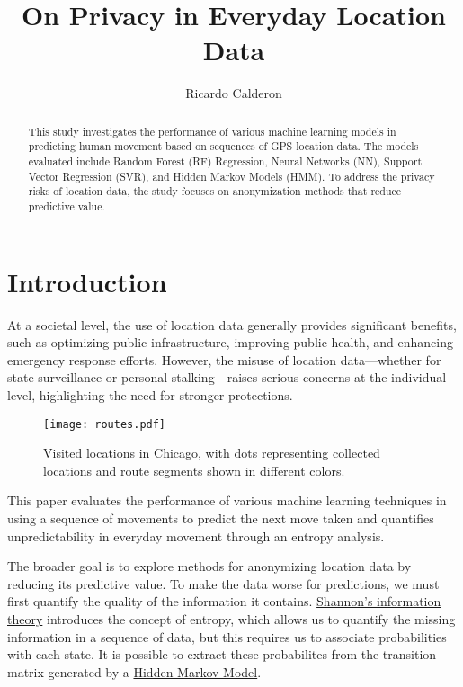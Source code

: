 \documentclass[11pt]{amsart}
\begin{document}
\title{On Privacy in Everyday Location Data} %
\author{Ricardo Calderon}
\maketitle
\begin{abstract}
    This study investigates the performance of various machine learning models in predicting human movement based on sequences of GPS location data.
    The models evaluated include Random Forest (RF) Regression, Neural Networks (NN), Support Vector Regression (SVR), and Hidden Markov Models (HMM).
    To address the privacy risks of location data, the study focuses on anonymization methods that reduce predictive value.
\end{abstract}
\section{Introduction}

At a societal level, the use of location data generally provides significant benefits, such as optimizing public infrastructure, improving public health, and enhancing emergency response efforts.
However, the misuse of location data---whether for state surveillance or personal stalking---raises serious concerns at the individual level, highlighting the need for stronger protections.

\begin{wrapfigure}{r}{0.4\textwidth}
\centering
\vspace{-.25cm}
\texttt{[image: routes.pdf]} %
\caption{\small Visited locations in Chicago, with dots representing collected locations and route segments shown in different colors.}
\label{fig:routes}
\end{wrapfigure}

This paper evaluates the performance of various machine learning techniques in using a sequence of movements to predict the next move taken and quantifies unpredictability in everyday movement through an entropy analysis.

The broader goal is to explore methods for anonymizing location data by reducing its predictive value.
To make the data worse for predictions, we must first quantify the quality of the information it contains.
\href{https://en.wikipedia.org/wiki/Entropy_(information_theory)}{Shannon's information theory} introduces the concept of entropy, which allows us to quantify the missing information in a sequence of data, but this requires us to associate probabilities with each state.
It is possible to extract these probabilites from the transition matrix generated by a \href{https://en.wikipedia.org/wiki/Hidden_Markov_model}{Hidden Markov Model}.
\end{document}
